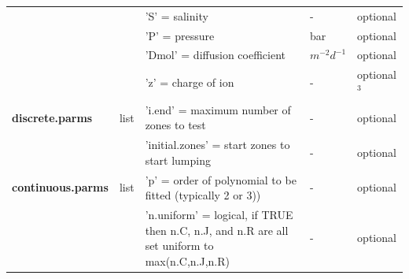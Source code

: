 \documentclass[10pt]{article}
\begin{document}
\begin{table}[!h]
\begin{tabular}{p{2.5cm} p{1.5cm} p{5cm} p{2cm} p{1.5cm} }
		 & & 'S' = salinity & - & optional  \\
		 & & 'P' = pressure & bar & optional  \\
		 & & 'Dmol' = diffusion coefficient & $m^{-2} d^{-1}$ & optional  \\
		 & & 'z' = charge of ion & - & optional$^{3}$  \\
		 \textbf{discrete.parms} & list & 'i.end' = maximum number of zones to test & - & optional  \\
		 & & 'initial.zones' = start zones to start lumping & - & optional  \\
		 \textbf{continuous.parms} & list & 'p' = order of polynomial to be fitted (typically 2 or 3)) & - & optional  \\
		 & & 'n.uniform' = logical, if TRUE then n.C, n.J, and n.R are all set uniform to max(n.C,n.J,n.R) & - & optional \\

\end{tabular}
\end{table}
\end{document}
